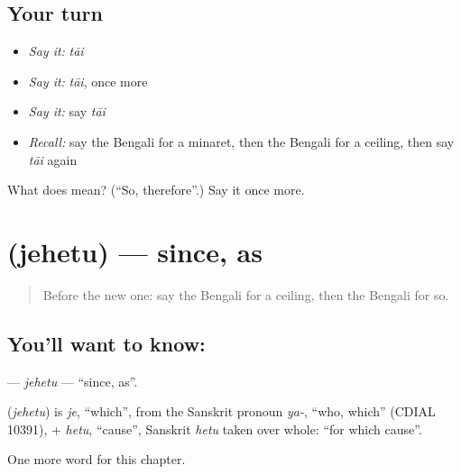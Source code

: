 \subsection*{Your turn}
\begin{itemize}
\raggedright
  \item \emph{Say it:} \emph{tāi}
  \item \emph{Say it:} \emph{tāi}, once more
  \item \emph{Say it:} say \emph{tāi}
  \item \emph{Recall:} say the Bengali for a minaret, then the Bengali for a ceiling, then say \emph{tāi} again
\end{itemize}

\begin{tcolorbox}[breakable,colback=teal!4,colframe=teal!35!black,title={Before you move on}]
What does  mean? (\textquotedblleft{}So, therefore\textquotedblright{}.) Say it once more.
\end{tcolorbox}
\section[\texorpdfstring{\bn{যেহেতু} (jehetu)}{যেহেতু (jehetu)}]{ (jehetu) — since, as}

\label{lesson:BN-C159-jehetu}



\begin{quote}
Before the new one: say the Bengali for a ceiling, then the Bengali for so.
\end{quote}

\subsection*{You'll want to know: }
\textbf{} — \emph{jehetu} — \textquotedblleft{}since, as\textquotedblright{}.

\begin{cousinweb}
\textbf{} (\emph{jehetu}) is \emph{je}, \textquotedblleft{}which\textquotedblright{}, from the Sanskrit pronoun \emph{ya-}, \textquotedblleft{}who, which\textquotedblright{} (CDIAL 10391), + \emph{hetu}, \textquotedblleft{}cause\textquotedblright{}, Sanskrit \emph{hetu} taken over whole: \textquotedblleft{}for which cause\textquotedblright{}.
\end{cousinweb}

\begin{grammarlens}[title={What you've built}]
One more word for this chapter.
\end{grammarlens}

